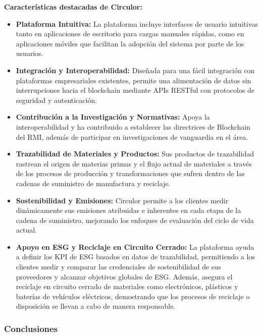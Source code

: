 \documentclass[main.tex]{subfiles}
\begin{document}
\textbf{Características destacadas de Circulor:}
\begin{itemize}
  \item \textbf{Plataforma Intuitiva:} La plataforma incluye interfaces de usuario intuitivas tanto en aplicaciones de escritorio para cargas manuales rápidas, como en aplicaciones móviles que facilitan la adopción del sistema por parte de los usuarios.
  \item \textbf{Integración y Interoperabilidad:} Diseñada para una fácil integración con plataformas empresariales existentes, permite una alimentación de datos sin interrupciones hacia el blockchain mediante APIs RESTful con protocolos de seguridad y autenticación.
  \item \textbf{Contribución a la Investigación y Normativas:} Apoya la interoperabilidad y ha contribuido a establecer las directrices de Blockchain del RMI, además de participar en investigaciones de vanguardia en el área.
  \item \textbf{Trazabilidad de Materiales y Productos:} Sus productos de trazabilidad rastrean el origen de materias primas y el flujo actual de materiales a través de los procesos de producción y transformaciones que sufren dentro de las cadenas de suministro de manufactura y reciclaje.
  \item \textbf{Sostenibilidad y Emisiones:} Circulor permite a los clientes medir dinámicamente sus emisiones atribuidas e inherentes en cada etapa de la cadena de suministro, mejorando los enfoques de evaluación del ciclo de vida actual.
  \item \textbf{Apoyo en ESG y Reciclaje en Circuito Cerrado:} La plataforma ayuda a definir los KPI de ESG basados en datos de trazabilidad, permitiendo a los clientes medir y comparar las credenciales de sostenibilidad de sus proveedores y alcanzar objetivos globales de ESG. Además, asegura el reciclaje en circuito cerrado de materiales como electrónicos, plásticos y baterías de vehículos eléctricos, demostrando que los procesos de reciclaje o disposición se llevan a cabo de manera responsable.
\end{itemize}

\subsubsection{Conclusiones}
\end{document}
